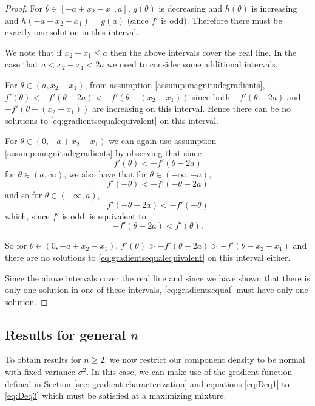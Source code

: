 \begin{proof}
			For $\theta \in [-a + x_2 - x_1, a]$, $g(\theta)$ is decreasing and $h(\theta)$ is increasing and $h(-a +x_2 -x_1) = g(a)$ (since $f'$ is odd). Therefore there must be exactly one solution in this interval.
			
			We note that if $x_2 - x_1 \leq a$ then the above intervals cover the real line. In the case that $a <x_2 - x_1 < 2a$ we need to consider some additional intervals.

			For $\theta \in (a,x_2 - x_1)$, from assumption \ref{assump:magnitudegradients}, $f'(\theta) < -f'(\theta - 2a) < -f'(\theta - (x_2 - x_1))$ since both $-f'(\theta - 2a)$ and $-f'(\theta - (x_2 - x_1))$ are increasing on this interval. Hence there can be no solutions to \eqref{eq:gradientsequalequivalent} on this interval.
			
			For $\theta \in (0, -a+x_2 - x_1)$ we can again use assumption \ref{assump:magnitudegradients} by observing that since 
			\begin{equation}
				f'(\theta) < -f'(\theta - 2a)
			\end{equation}
			for $\theta \in (a, \infty)$, we also have that for $\theta \in (-\infty, -a)$,
			\begin{equation}
				f'(-\theta) < -f'(-\theta - 2a)
			\end{equation}
			and so for $\theta \in (-\infty, a)$,
			\begin{equation}
				f'(-\theta + 2a) < -f'(-\theta)
			\end{equation}
			which, since $f'$ is odd, is equivalent to 
			\begin{equation}
				-f'(\theta - 2a) < f'(\theta).
			\end{equation}

			So for $\theta \in (0,-a+x_2-x_1)$,  $f'(\theta)>-f'(\theta - 2a) > -f'(\theta - x_2 - x_1)$ and there are no solutions to \eqref{eq:gradientsequalequivalent} on this interval either.
			
			Since the above intervals cover the real line and since we have shown that there is only one solution in one of these intervals, \eqref{eq:gradientsequal} must have only one solution.
		\end{proof}

	\subsection{Results for general \texorpdfstring{$n$}{n}}
	\label{sec: results for general n}
	To obtain results for $n \geq 2$, we now restrict our component density to be normal with fixed variance $\sigma^2$. In this case, we can make use of the gradient function defined in Section \ref{sec: gradient characterization} and equations \eqref{eq:Deq1} to \eqref{eq:Deq3} which must be satisfied at a maximizing mixture.

